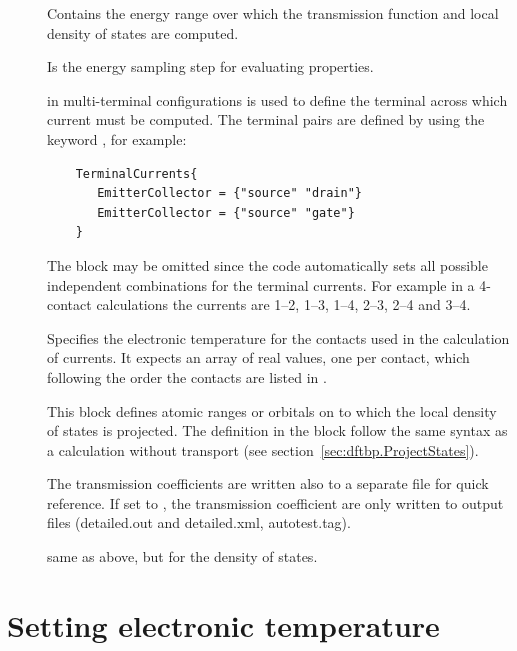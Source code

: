 \begin{description}


\item[] Contains the energy range over
  which the transmission function and local density of states are computed.
\item[] Is the energy sampling step for
  evaluating properties.
\item[] in multi-terminal configurations is used to define
  the terminal across which current must be computed. The terminal pairs are
  defined by using the keyword , for example:
   \begin{verbatim}
    TerminalCurrents{
       EmitterCollector = {"source" "drain"}
       EmitterCollector = {"source" "gate"}
    }
  \end{verbatim}
  The block  may be omitted since the code automatically
  sets all possible independent combinations for the terminal currents. For
  example in a 4-contact calculations the currents are 1--2, 1--3, 1--4, 2--3,
  2--4 and 3--4.
\item[] Specifies the electronic
  temperature for the contacts used in the calculation of currents. It expects
  an array of real values, one per contact, which following the order the
  contacts are listed in .
\item[] \label{Region} This block defines atomic ranges or orbitals
  on to which the local density of states is projected. The definition in the
  block follow the same syntax as a \dftbp{} calculation without transport (see
  section~\ref{sec:dftbp.ProjectStates}).
\item[] The transmission coefficients are written also to a
  separate file for quick reference. If set to , the transmission
  coefficient are only written to \dftbp{} output files (detailed.out and
  detailed.xml, autotest.tag).
\item[] same as above, but for the density of states.

\end{description}

\section{Setting electronic temperature}

